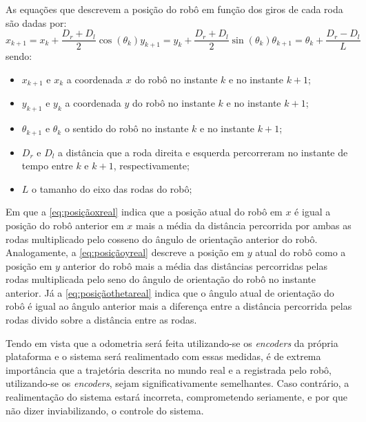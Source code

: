 As equações que descrevem a posição do robô em função dos giros de cada roda são dadas por:
\begin{subequations}
	\begin{equation}
	x_{k+1} = x_{k} + \dfrac{D_{r} + D_{l}}{2}\cos(\theta_{k}) 
	\label{eq:posiçãoxreal}
	\end{equation}
	\begin{equation}
	y_{k+1} = y_{k} + \dfrac{D_{r} + D_{l}}{2}\sin(\theta_{k}) 
	\label{eq:posiçãoyreal}
	\end{equation}
	\begin{equation}
	\theta_{k+1} = \theta_{k} + \dfrac{D_{r} - D_{l}}{L}
	\label{eq:posiçãothetareal}
	\end{equation}
	\label{eq:posicaorealEnc}
\end{subequations}
sendo:
\begin{itemize}
	\item $x_{k+1}$ e $x_{k}$ a coordenada $x$ do robô no instante $k$ e no instante $k+1$;
	\item $y_{k+1}$ e $y_{k}$ a coordenada $y$ do robô no instante $k$ e no instante $k+1$;
	\item $\theta_{k+1}$ e $\theta_{k}$ o sentido do robô no instante $k$ e no instante $k+1$;	
	\item $D_{r}$ e $D_{l}$ a distância que a roda direita e esquerda percorreram no instante de tempo entre $k$ e $k+1$, respectivamente;
	\item $L$ o tamanho do eixo das rodas do robô;
\end{itemize}
Em que a \autoref{eq:posiçãoxreal} indica que a posição atual do robô em $x$ é igual a posição do robô anterior em $x$ mais a média da distância percorrida por ambas as rodas multiplicado pelo cosseno do ângulo de orientação anterior do robô. Analogamente, a \autoref{eq:posiçãoyreal} descreve a posição em $y$ atual do robô como a posição em $y$ anterior do robô mais a média das distâncias percorridas pelas rodas multiplicada pelo seno do ângulo de orientação do robô no instante anterior. Já a \autoref{eq:posiçãothetareal} indica que o ângulo atual de orientação do robô é igual ao ângulo anterior mais a diferença entre a distância percorrida pelas rodas divido sobre a distância entre as rodas. 

Tendo em vista que a odometria será feita utilizando-se os \emph{encoders} da própria plataforma e o sistema será realimentado com essas medidas, é de extrema importância que a trajetória descrita no mundo real e a registrada pelo robô, utilizando-se os \emph{encoders}, sejam significativamente semelhantes. Caso contrário, a realimentação do sistema estará incorreta, comprometendo seriamente, e por que não dizer inviabilizando, o controle do sistema. 

